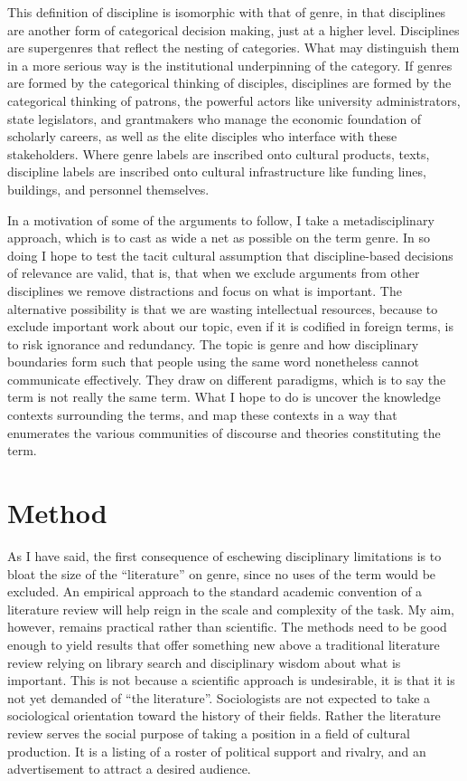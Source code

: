 \documentclass[]{book}
\theoremstyle{definition}
\theoremstyle{definition}
\theoremstyle{definition}
\theoremstyle{remark}
\begin{document}
This definition of discipline is isomorphic with that of genre, in that
disciplines are another form of categorical decision making, just at a
higher level. Disciplines are supergenres that reflect the nesting of
categories. What may distinguish them in a more serious way is the
institutional underpinning of the category. If genres are formed by the
categorical thinking of disciples, disciplines are formed by the
categorical thinking of patrons, the powerful actors like university
administrators, state legislators, and grantmakers who manage the
economic foundation of scholarly careers, as well as the elite disciples
who interface with these stakeholders. Where genre labels are inscribed
onto cultural products, texts, discipline labels are inscribed onto
cultural infrastructure like funding lines, buildings, and personnel
themselves.

In a motivation of some of the arguments to follow, I take a
metadisciplinary approach, which is to cast as wide a net as possible on
the term genre. In so doing I hope to test the tacit cultural assumption
that discipline-based decisions of relevance are valid, that is, that
when we exclude arguments from other disciplines we remove distractions
and focus on what is important. The alternative possibility is that we
are wasting intellectual resources, because to exclude important work
about our topic, even if it is codified in foreign terms, is to risk
ignorance and redundancy. The topic is genre and how disciplinary
boundaries form such that people using the same word nonetheless cannot
communicate effectively. They draw on different paradigms, which is to
say the term is not really the same term. What I hope to do is uncover
the knowledge contexts surrounding the terms, and map these contexts in
a way that enumerates the various communities of discourse and theories
constituting the term.

\hypertarget{method}{%
\section{Method}\label{method}}

As I have said, the first consequence of eschewing disciplinary
limitations is to bloat the size of the ``literature'' on genre, since
no uses of the term would be excluded. An empirical approach to the
standard academic convention of a literature review will help reign in
the scale and complexity of the task. My aim, however, remains practical
rather than scientific. The methods need to be good enough to yield
results that offer something new above a traditional literature review
relying on library search and disciplinary wisdom about what is
important. This is not because a scientific approach is undesirable, it
is that it is not yet demanded of ``the literature''. Sociologists are
not expected to take a sociological orientation toward the history of
their fields. Rather the literature review serves the social purpose of
taking a position in a field of cultural production. It is a listing of
a roster of political support and rivalry, and an advertisement to
attract a desired audience.
\end{document}
